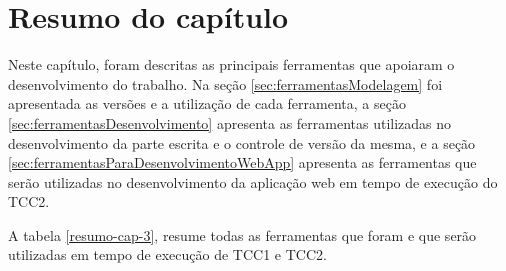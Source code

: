 \section{Resumo do capítulo}

Neste capítulo, foram descritas as principais ferramentas que apoiaram o desenvolvimento do trabalho. Na seção \ref{sec:ferramentasModelagem} foi apresentada as versões e a utilização de cada ferramenta, a seção \ref{sec:ferramentasDesenvolvimento} apresenta as ferramentas utilizadas no desenvolvimento da parte escrita e o controle de versão da mesma, e a seção \ref{sec:ferramentasParaDesenvolvimentoWebApp} apresenta as ferramentas que serão utilizadas no desenvolvimento da aplicação web em tempo de execução do TCC2. 

A tabela \ref{resumo-cap-3}, resume todas as ferramentas que foram e que serão utilizadas em tempo de execução de TCC1 e TCC2. 

